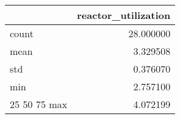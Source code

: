 \begin{tabular}{lr}
\toprule
 & reactor\_utilization \\
\midrule
count & 28.000000 \\
mean & 3.329508 \\
std & 0.376070 \\
min & 2.757100 \\
25%
50%
75%
max & 4.072199 \\
\bottomrule
\end{tabular}

